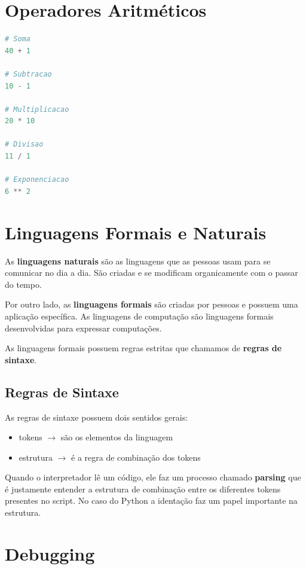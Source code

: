 \documentclass[a4paper,11pt]{book}
\begin{document}
\section{Operadores Aritméticos}
\begin{lstlisting}[language=Python, caption=Operadores Básicos]
# Soma
40 + 1

# Subtracao
10 - 1

# Multiplicacao
20 * 10

# Divisao
11 / 1

# Exponenciacao
6 ** 2

\end{lstlisting}

\section{Linguagens Formais e Naturais}

As \textbf{linguagens naturais} são as linguagens que as pessoas usam para se comunicar no dia a dia. São criadas e se modificam organicamente com o passar do tempo.

Por outro lado, as \textbf{linguagens formais} são criadas por pessoas e possuem uma aplicação específica. As linguagens de computação são linguagens formais desenvolvidas para expressar computações.

As linguagens formais possuem regras estritas que chamamos de \textbf{regras de sintaxe}.

\subsection{Regras de Sintaxe}

As regras de sintaxe possuem dois sentidos gerais:
\begin{itemize}
	\item tokens $\rightarrow$ são os elementos da linguagem
	\item estrutura $\rightarrow$ é a regra de combinação dos tokens
\end{itemize}

Quando o interpretador lê um código, ele faz um processo chamado \textbf{parsing} que é justamente entender a estrutura de combinação entre os diferentes tokens presentes no script. No caso do Python a identação faz um papel importante na estrutura.

\section{Debugging}
\end{document}
